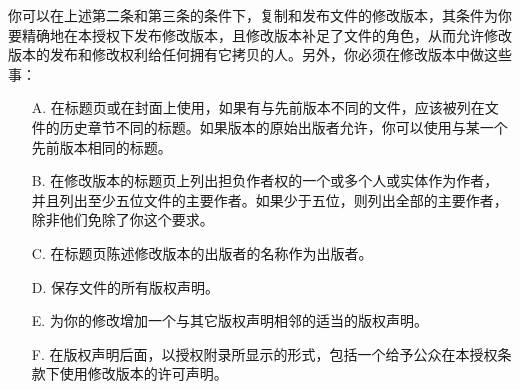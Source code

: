 你可以在上述第二条和第三条的条件下，复制和发布文件的修改版本，其条件为你要精确地在本授权下发布修改版本，且修改版本补足了文件的角色，从而允许修改版本的发布和修改权利给任何拥有它拷贝的人。另外，你必须在修改版本中做这些事：
%
\begin{itemize}
    \item[A.] 在标题页或在封面上使用，如果有与先前版本不同的文件，应该被列在文件的历史章节不同的标题。如果版本的原始出版者允许，你可以使用与某一个先前版本相同的标题。
    \item[B.] 在修改版本的标题页上列出担负作者权的一个或多个人或实体作为作者，并且列出至少五位文件的主要作者。如果少于五位，则列出全部的主要作者，除非他们免除了你这个要求。
    \item[C.] 在标题页陈述修改版本的出版者的名称作为出版者。 
    \item[D.] 保存文件的所有版权声明。
    \item[E.] 为你的修改增加一个与其它版权声明相邻的适当的版权声明。 
    \item[F.] 在版权声明后面，以授权附录所显示的形式，包括一个给予公众在本授权条款下使用修改版本的许可声明。

\end{itemize}
